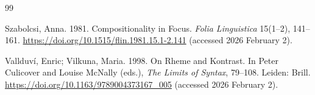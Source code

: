 \documentclass[ruler]{CUP-JNL-LIN}%
\begin{document}
\begin{Backmatter}
\begin{thebibliography}{99}

{Szabolcsi, Anna}. 1981. Compositionality in Focus. \textit{Folia Linguistica} 15(1--2), 141--161. \url{https://doi.org/10.1515/flin.1981.15.1-2.141} (accessed 2026 February 2).




{Vallduví, Enric; Vilkuna, Maria}. 1998. On Rheme and Kontrast. In Peter Culicover and Louise McNally (eds.), \textit{The Limits of Syntax}, 79--108. Leiden: Brill. \url{https://doi.org/10.1163/9789004373167_005} (accessed 2026 February 2).





\end{thebibliography}
\end{Backmatter}
\end{document}
